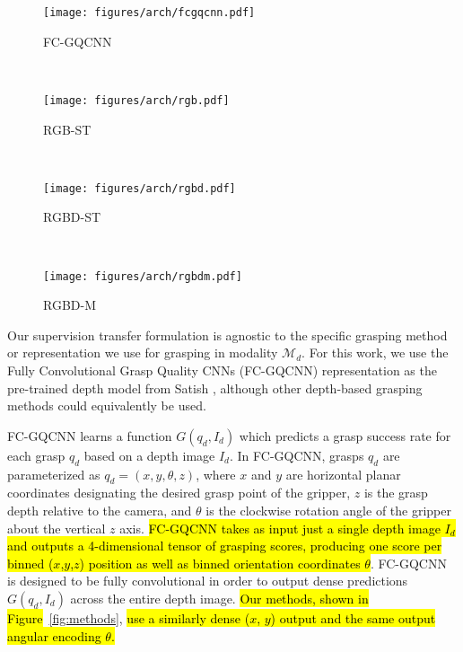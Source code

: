 \begin{figure*}[ht]
    \centering
    \begin{subfigure}[t]{0.18\textwidth}
        \centering
        \texttt{[image: figures/arch/fcgqcnn.pdf]}
        \caption{FC-GQCNN \cite{satish2019policy}}
        \label{fig:method-fcgqcnn}
    \end{subfigure}%
    ~
    \begin{subfigure}[t]{0.18\textwidth}
        \centering
        \texttt{[image: figures/arch/rgb.pdf]}
        \caption{RGB-ST}
        \label{fig:method-rgbst}
    \end{subfigure}%
    ~ 
    \begin{subfigure}[t]{0.18\textwidth}
        \centering
        \texttt{[image: figures/arch/rgbd.pdf]}
        \caption{RGBD-ST}
        \label{fig:method-rgbdst}
    \end{subfigure}
    ~
    \begin{subfigure}[t]{0.34\textwidth}
        \centering
        \texttt{[image: figures/arch/rgbdm.pdf]}
        \caption{RGBD-M}
        \label{fig:method-rgbdm}
    \end{subfigure}
    \caption{\hl{Diagrams of the four methods evaluated in this work. We compare against FC-GQCNN }\cite{satish2019policy}\hl{, which takes a depth image as input and outputs dense grasp scores over image coordinates $x,y$ and rotation $\theta$ about the depth axis. RGB-ST and RGBD-ST are both trained using supervision transfer, but differ in the input they accept (3-channel RGB or 4-channel RGB-D input). RGBD-M takes the outputs of the RGB and Depth networks and averages them to produce the final output.}}
    \label{fig:methods}
\end{figure*}

Our supervision transfer formulation is agnostic to the specific grasping method or representation we use for grasping in modality $\mathcal{M}_d$.
For this work, we use the Fully Convolutional Grasp Quality CNNs (FC-GQCNN) representation as the pre-trained depth model from Satish \etal\cite{satish2019policy}, although other depth-based grasping methods could equivalently be used.

FC-GQCNN learns a function $G(q_d, I_d)$ which predicts a grasp success rate for each grasp $q_d$ based on a depth image $I_d$.  In FC-GQCNN, grasps $q_d$ are parameterized as $q_d = (x, y, \theta, z)$, where $x$ and $y$ are horizontal planar coordinates designating the desired grasp point of the gripper, $z$ is the grasp depth relative to the camera, and $\theta$ is the clockwise rotation angle of the gripper about the vertical $z$ axis.  \hl{FC-GQCNN takes as input just a single depth image $I_d$ and outputs a 4-dimensional tensor of grasping scores, producing one score per binned ($x$,$y$,$z$) position as well as binned orientation coordinates $\theta$}. FC-GQCNN is designed to be fully convolutional in order to output dense predictions $G(q_d, I_d)$ across the entire depth image. \hl{Our methods, shown in Figure}~\ref{fig:methods}, \hl{use a similarly dense ($x$, $y$) output and the same output angular encoding $\theta$.}

